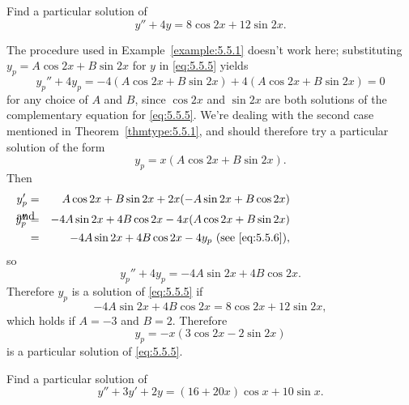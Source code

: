 \begin{example}
  \label{example:5.5.2} \rm Find a particular solution of
  \begin{equation}
    \label{eq:5.5.5}y''+4y=8\cos2x+12\sin2x.
  \end{equation}
\end{example}

\begin{examplesolution}
\solution The procedure used in Example~\ref{example:5.5.1} doesn't work here; substituting
$y_{p}=A\cos2x+B\sin2x$ for $y$ in \eqref{eq:5.5.5} yields
\[
  y_{p}''+4y_{p}=-4(A\cos2x+B\sin2x)+4(A\cos2x+B\sin2x)=0
\]
for any choice of $A$ and $B$, since $\cos2x$ and $\sin2x$ are both solutions of the complementary
equation for \eqref{eq:5.5.5}. We're dealing with the second case mentioned in
Theorem~\ref{thmtype:5.5.1}, and should therefore try a particular solution of the form
\begin{equation}
  \label{eq:5.5.6}y_{p}=x(A\cos2x+B\sin2x).
\end{equation}
Then
\begin{eqnarray*}
  y_{p}'                 & = & A\cos2x+B\sin2x+2x(-A\sin2x+B\cos2x)   \\
  \arraytext{and}y_{p}'' & = & -4A\sin2x+4B\cos2x-4x(A\cos2x+B\sin2x) \\
                         & = & -4A\sin2x+4B\cos2x-4y_{p}\mbox{ (see \eqref{eq:5.5.6})},
\end{eqnarray*}
so
\[
  y_{p}''+4y_{p}=-4A\sin2x+4B\cos2x.
\]
Therefore $y_{p}$ is a solution of \eqref{eq:5.5.5} if
\[
  -4A\sin2x+4B\cos2x=8\cos2x+12\sin2x,
\]
which holds if $A=-3$ and $B=2$. Therefore
\[
  y_{p}=-x(3\cos2x-2\sin2x)
\]
is a particular solution of \eqref{eq:5.5.5}.
\end{examplesolution}

\begin{example}
  \label{example:5.5.3} \rm Find a particular solution of
  \begin{equation}
    \label{eq:5.5.7}y''+3y'+2y=(16+20x)\cos x+10\sin x.
  \end{equation}
\end{example}

